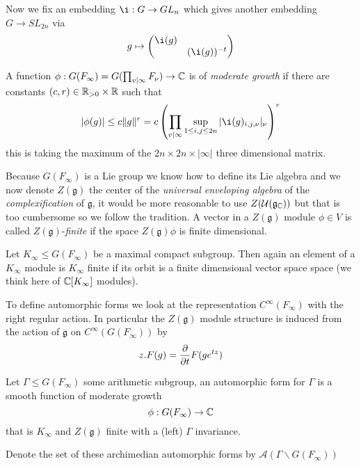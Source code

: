 Now we fix an embedding \(\i : G\to GL_n\) which gives another embedding \(G\to SL_{2n}\) via
	\[g\mapsto \begin{pmatrix}
		\i (g) & \\
		 & (\i (g))^{-t}
	\end{pmatrix}\]

	A function \(\phi : G(F_\infty) = G(\prod_{v|\infty} F_\nu) \to \C \) is of \textit{moderate growth} if there are constants \((c,r)\in \R_{>0}\times \R\) such that 
	\[|\phi(g)| \leq c\norm{g}^r = c \left(\prod_{v|\infty} \sup_{1\leq i, j\leq 2n} |\i (g)_{i,j, \nu}|_\nu\right)^r\]
	this is taking the maximum of the \(2n\times 2n \times |\infty| \) three dimensional matrix. 


    Because \(G(F_\infty)\) is a Lie group we know how to define its Lie algebra and we now denote \(Z(\mathfrak{g})\) the center of the \textit{universal enveloping algebra} of the \textit{complexification} of \(\mathfrak{g}\), it would be more reasonable to use \(Z(\mathcal{U}(\mathfrak{g}_{\C}))\) but that is too cumbersome so we follow the tradition. 
    A vector in a \(Z(\mathfrak{g})\) module \(\phi\in V\) is called \(Z(\mathfrak{g})\)-\textit{finite} if the space \(Z(\mathfrak{g})\phi\) is finite dimensional. 

	Let \(K_\infty\leq G(F_\infty)\) be a maximal compact subgroup. Then again an element of a \(K_\infty\) module is \(K_\infty\) finite if its orbit is a finite dimensional vector space space (we think here of \(\C[K_\infty]\) modules).

	To define automorphic forms we look at the representation \(C^\infty(F_\infty)\) with the right regular action.  In particular the \(Z(\mathfrak{g})\) module structure is induced from the action of \(\mathfrak{g}\) on \(C^\infty(G(F_\infty))\) by 
	\[z.F(g) = \frac{\partial }{\partial t}F(ge^{tz})\] 

	\begin{Definition}
		Let \(\Gamma\leq G(F_\infty)\) some arithmetic subgroup, an automorphic form for \(\Gamma\) is a smooth function of moderate growth 
		\[\phi: G(F_\infty) \to \C\]
		that is \(K_\infty\) and \(Z(\mathfrak{g})\) finite with a (left) \(\Gamma\) invariance. 

		Denote the set of these archimedian automorphic forms by \(\mathcal{A}(\Gamma \backslash G(F_\infty))\)

	\end{Definition}

